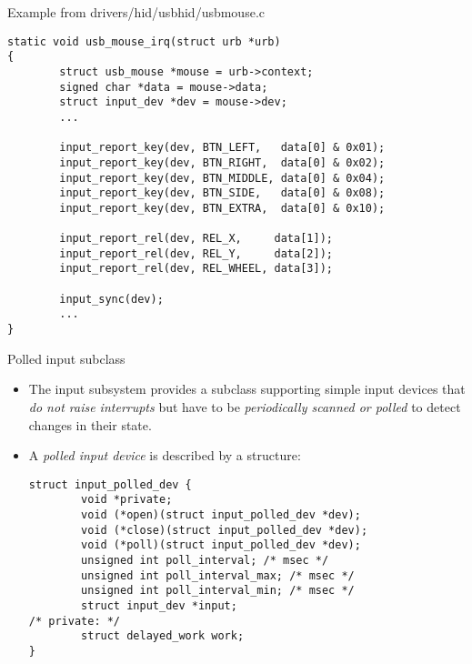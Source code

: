\begin{frame}[fragile]{Example from drivers/hid/usbhid/usbmouse.c}
  \begin{block}{}
  \begin{verbatim}
static void usb_mouse_irq(struct urb *urb)
{
        struct usb_mouse *mouse = urb->context;
        signed char *data = mouse->data;
        struct input_dev *dev = mouse->dev;
        ...

        input_report_key(dev, BTN_LEFT,   data[0] & 0x01);
        input_report_key(dev, BTN_RIGHT,  data[0] & 0x02);
        input_report_key(dev, BTN_MIDDLE, data[0] & 0x04);
        input_report_key(dev, BTN_SIDE,   data[0] & 0x08);
        input_report_key(dev, BTN_EXTRA,  data[0] & 0x10);

        input_report_rel(dev, REL_X,     data[1]);
        input_report_rel(dev, REL_Y,     data[2]);
        input_report_rel(dev, REL_WHEEL, data[3]);

        input_sync(dev);
        ...
}
  \end{verbatim}
  \end{block}
\end{frame}

\begin{frame}[fragile]{Polled input subclass}
  \begin{itemize}
  \item The input subsystem provides a subclass supporting simple input
    devices that {\em do not raise interrupts} but have to be {\em
      periodically scanned or polled} to detect changes in their
    state.
  \item A {\em polled input device} is described by a
     structure:
    \begin{block}{}
    \begin{verbatim}
struct input_polled_dev {
        void *private;
        void (*open)(struct input_polled_dev *dev);
        void (*close)(struct input_polled_dev *dev);
        void (*poll)(struct input_polled_dev *dev);
        unsigned int poll_interval; /* msec */
        unsigned int poll_interval_max; /* msec */
        unsigned int poll_interval_min; /* msec */
        struct input_dev *input;
/* private: */
        struct delayed_work work;
}
    \end{verbatim}
    \end{block}
  \end{itemize}
\end{frame}

